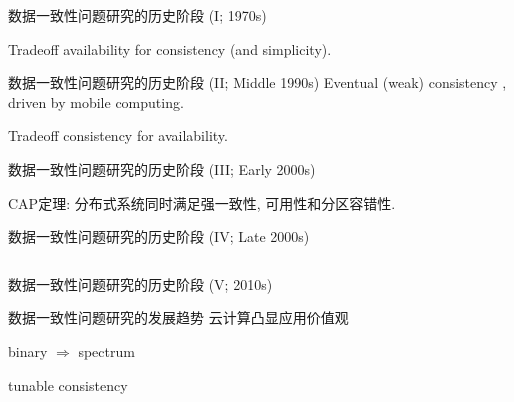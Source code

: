 \begin{frame}{数据一致性问题研究的历史阶段 (I; 1970s)}

  \begin{center}
	Tradeoff availability for consistency {\scriptsize (and simplicity)}.
  \end{center}
\end{frame}
\begin{frame}{数据一致性问题研究的历史阶段 (II; Middle 1990s)}
  Eventual {\scriptsize (weak)} consistency ,  driven by mobile computing.
  

  \begin{center}
	Tradeoff consistency for availability.
  \end{center}
\end{frame}
\begin{frame}{数据一致性问题研究的历史阶段 (III; Early 2000s)}

  CAP定理: 分布式系统同时满足强一致性, 可用性和分区容错性.
   
\end{frame}
\begin{frame}{数据一致性问题研究的历史阶段 (IV; Late 2000s)}

  \begin{columns}
  \end{columns}
\end{frame}
\begin{frame}{数据一致性问题研究的历史阶段 (V; 2010s)}
\end{frame}
\begin{frame}{数据一致性问题研究的发展趋势}
  云计算凸显应用价值观

  binary $\Rightarrow$ spectrum

  tunable consistency

\end{frame}
